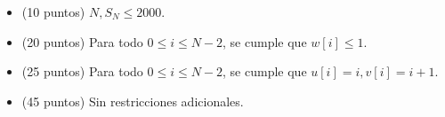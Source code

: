 \documentclass[12pt]{scrartcl}
\begin{document}


    \begin{itemize}
        \item (10 puntos) $N, S_N \le 2000$.
        \item (20 puntos) Para todo $0 \le i \le N - 2$, se cumple que $w[i] \le 1$.
        \item (25 puntos) Para todo $0 \le i \le N - 2$, se cumple que $u[i] = i, v[i] = i + 1$.
        \item (45 puntos) Sin restricciones adicionales.
    \end{itemize}
\end{document}
